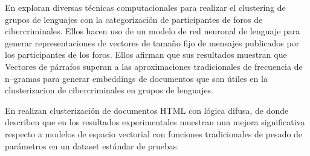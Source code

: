 En \cite{Benjamin2016} exploran diversas técnicas computacionales para realizar el \gls{clustering} de grupos de lenguajes con la categorización de participantes de foros de cibercriminales. Ellos hacen uso de un modelo de red neuronal de lenguaje para generar representaciones de vectores de tamaño fijo de mensajes publicados por los participantes de los foros. Ellos afirman que sus resultados muestran que Vectores de párrafos superan a las aproximaciones tradicionales de frecuencia de n--gramas para generar embeddings de documentos que son útiles en la clusterizacion de cibercriminales en grupos de lenguajes.

En \cite{Garcia-Plaza2008} realizan clusterizaci\'on de documentos HTML con lógica difusa, de donde describen que en los resultados experimentales muestran una mejora significativa respecto a modelos de espacio vectorial con funciones tradicionales de pesado de parámetros en un dataset estándar de pruebas.
